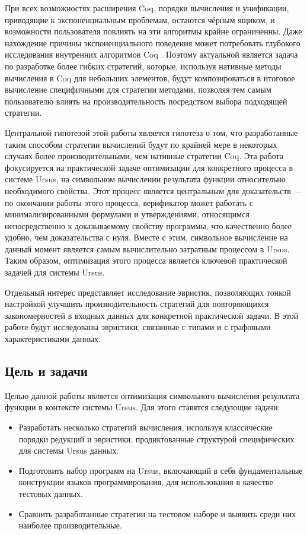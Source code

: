 \documentclass[../diploma.tex]{subfiles}
\begin{document}
При всех возможностях расширения Coq, порядки вычисления и унификации, приводящие к экспоненциальным проблемам, остаются чёрным ящиком, и возможности пользователя повлиять на эти алгоритмы крайне ограниченны. Даже нахождение причины экспоненциального поведения может потребовать глубокого исследования внутренних алгоритмов Coq \cite{gross_phd}. Поэтому актуальной является задача по разработке более гибких стратегий, которые, используя нативные методы вычисления в Coq для небольших элементов, будут композироваться в итоговое вычисление специфичными для стратегии методами, позволяя тем самым пользователю влиять на производительность посредством выбора подходящей стратегии.

Центральной гипотезой этой работы является гипотеза о том, что разработанные таким способом стратегии вычислений будут по крайней мере в некоторых случаях более производительными, чем нативные стратегии Coq. Эта работа фокусируется на практической задаче оптимизации для конкретного процесса в системе Ursus, на символьном вычислении результата функции относительно необходимого свойства. Этот процесс является центральным для доказательств --- по окончании работы этого процесса, верификатор может работать с минимализированными формулами и утверждениями, относящимся непосредственно к доказываемому свойству программы, что качественно более удобно, чем доказательства с нуля. Вместе с этим, символьное вычисление на данный момент является самым вычислительно затратным процессом в Ursus. Таким образом, оптимизация этого процесса является ключевой практической задачей для системы Ursus.

Отдельный интерес представляет исследование эвристик, позволяющих тонкой настройкой улучшить производительность стратегий для повторяющихся закономерностей в входных данных для конкретной практической задачи. В этой работе будут исследованы эвристики, связанные с типами и с графовыми характеристиками данных.

\subsection*{Цель и задачи}

Целью данной работы является оптимизация символьного вычисления результата функции в контексте системы Ursus. Для этого ставятся следующие задачи:

\begin{itemize}
	\item Разработать несколько стратегий вычисления, используя классические порядки редукций и эвристики, продиктованные структурой специфических для системы Ursus данных.
	\item Подготовить набор программ на Ursus, включающий в себя фундаментальные конструкции языков программирования, для использования в качестве тестовых данных.
	\item Сравнить разработанные стратегии на тестовом наборе и выявить среди них наиболее производительные.
\end{itemize}
\end{document}
